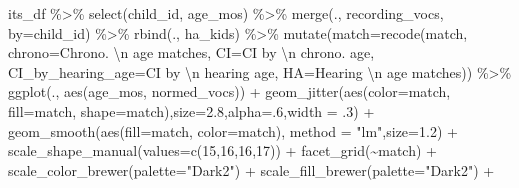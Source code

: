\documentclass[
]{article}
\newenvironment{Shaded}{\begin{snugshade}}{\end{snugshade}}
\newcommand{\AttributeTok}[1]{\textcolor[rgb]{0.77,0.63,0.00}{#1}}
\newcommand{\DecValTok}[1]{\textcolor[rgb]{0.00,0.00,0.81}{#1}}
\newcommand{\FloatTok}[1]{\textcolor[rgb]{0.00,0.00,0.81}{#1}}
\newcommand{\FunctionTok}[1]{\textcolor[rgb]{0.00,0.00,0.00}{#1}}
\newcommand{\NormalTok}[1]{#1}
\newcommand{\SpecialCharTok}[1]{\textcolor[rgb]{0.00,0.00,0.00}{#1}}
\newcommand{\StringTok}[1]{\textcolor[rgb]{0.31,0.60,0.02}{#1}}
\begin{document}
\begin{Shaded}
\begin{Highlighting}[]
\NormalTok{its\_df }\SpecialCharTok{\%\textgreater{}\%}
  \FunctionTok{select}\NormalTok{(child\_id, age\_mos) }\SpecialCharTok{\%\textgreater{}\%}
  \FunctionTok{merge}\NormalTok{(., recording\_vocs, }\AttributeTok{by=}\StringTok{\textquotesingle{}child\_id\textquotesingle{}}\NormalTok{) }\SpecialCharTok{\%\textgreater{}\%}
  \FunctionTok{rbind}\NormalTok{(., ha\_kids) }\SpecialCharTok{\%\textgreater{}\%}
  \FunctionTok{mutate}\NormalTok{(}\AttributeTok{match=}\FunctionTok{recode}\NormalTok{(match,}
                      \AttributeTok{chrono=}\StringTok{\textquotesingle{}Chrono. }\SpecialCharTok{\textbackslash{}n}\StringTok{ age matches\textquotesingle{}}\NormalTok{,}
                      \AttributeTok{CI=}\StringTok{\textquotesingle{}CI by }\SpecialCharTok{\textbackslash{}n}\StringTok{ chrono. age\textquotesingle{}}\NormalTok{,}
                      \AttributeTok{CI\_by\_hearing\_age=}\StringTok{\textquotesingle{}CI by }\SpecialCharTok{\textbackslash{}n}\StringTok{ hearing age\textquotesingle{}}\NormalTok{,}
                      \AttributeTok{HA=}\StringTok{\textquotesingle{}Hearing }\SpecialCharTok{\textbackslash{}n}\StringTok{ age matches\textquotesingle{}}\NormalTok{)) }\SpecialCharTok{\%\textgreater{}\%}
\FunctionTok{ggplot}\NormalTok{(., }\FunctionTok{aes}\NormalTok{(age\_mos, normed\_vocs)) }\SpecialCharTok{+}
  \FunctionTok{geom\_jitter}\NormalTok{(}\FunctionTok{aes}\NormalTok{(}\AttributeTok{color=}\NormalTok{match, }\AttributeTok{fill=}\NormalTok{match, }\AttributeTok{shape=}\NormalTok{match),}\AttributeTok{size=}\FloatTok{2.8}\NormalTok{,}\AttributeTok{alpha=}\NormalTok{.}\DecValTok{6}\NormalTok{,}\AttributeTok{width =}\NormalTok{ .}\DecValTok{3}\NormalTok{) }\SpecialCharTok{+}
  \FunctionTok{geom\_smooth}\NormalTok{(}\FunctionTok{aes}\NormalTok{(}\AttributeTok{fill=}\NormalTok{match, }\AttributeTok{color=}\NormalTok{match), }\AttributeTok{method =} \StringTok{"lm"}\NormalTok{,}\AttributeTok{size=}\FloatTok{1.2}\NormalTok{) }\SpecialCharTok{+}
  \FunctionTok{scale\_shape\_manual}\NormalTok{(}\AttributeTok{values=}\FunctionTok{c}\NormalTok{(}\DecValTok{15}\NormalTok{,}\DecValTok{16}\NormalTok{,}\DecValTok{16}\NormalTok{,}\DecValTok{17}\NormalTok{)) }\SpecialCharTok{+}
  \FunctionTok{facet\_grid}\NormalTok{(}\SpecialCharTok{\textasciitilde{}}\NormalTok{match) }\SpecialCharTok{+}
  \FunctionTok{scale\_color\_brewer}\NormalTok{(}\AttributeTok{palette=}\StringTok{"Dark2"}\NormalTok{) }\SpecialCharTok{+}
  \FunctionTok{scale\_fill\_brewer}\NormalTok{(}\AttributeTok{palette=}\StringTok{"Dark2"}\NormalTok{) }\SpecialCharTok{+}

\end{Highlighting}
\end{Shaded}
\end{document}
